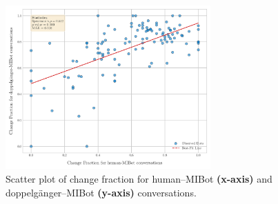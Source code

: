 \begin{figure}[ht!]
    \centering
    \includegraphics[width=0.7\textwidth]{fig/cf_doppelganger_human.pdf}
    \caption[Scatterplot of change fraction for humans and doppelgangers]{Scatter plot of change fraction for human--MIBot \textbf{(x-axis)} and doppelgänger--MIBot \textbf{(y-axis)} conversations.}
    \label{fig:cf_human_vs_doppel}
\end{figure}




